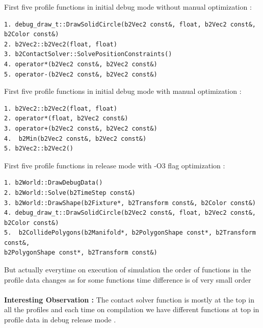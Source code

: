 \documentclass[12pt,a4paper]{article}
\begin{document}
First five profile functions in initial debug mode without manual optimization : 
\begin{verbatim}
1. debug_draw_t::DrawSolidCircle(b2Vec2 const&, float, b2Vec2 const&, b2Color const&)
2. b2Vec2::b2Vec2(float, float)
3. b2ContactSolver::SolvePositionConstraints()
4. operator*(b2Vec2 const&, b2Vec2 const&)
5. operator-(b2Vec2 const&, b2Vec2 const&)
\end{verbatim}
First five profile functions in initial debug mode with manual optimization :
\begin{verbatim}
1. b2Vec2::b2Vec2(float, float)
2. operator*(float, b2Vec2 const&)
3. operator+(b2Vec2 const&, b2Vec2 const&)
4.  b2Min(b2Vec2 const&, b2Vec2 const&)
5. b2Vec2::b2Vec2()
\end{verbatim}
First five profile functions in release mode with -O3 flag optimization :
\begin{verbatim}
1. b2World::DrawDebugData()
2. b2World::Solve(b2TimeStep const&)
3. b2World::DrawShape(b2Fixture*, b2Transform const&, b2Color const&)
4. debug_draw_t::DrawSolidCircle(b2Vec2 const&, float, b2Vec2 const&, b2Color const&)
5.  b2CollidePolygons(b2Manifold*, b2PolygonShape const*, b2Transform const&, 
b2PolygonShape const*, b2Transform const&) 
\end{verbatim}
But actually everytime on execution of simulation the order of functions in the profile data changes as for some functions time difference is of very small order
\\ 
\\
\textbf{Interesting Observation : }
The contact solver function is mostly at the top in all the profiles and each time on compilation we have different functions at top in profile data in debug release mode .
\end{document}
